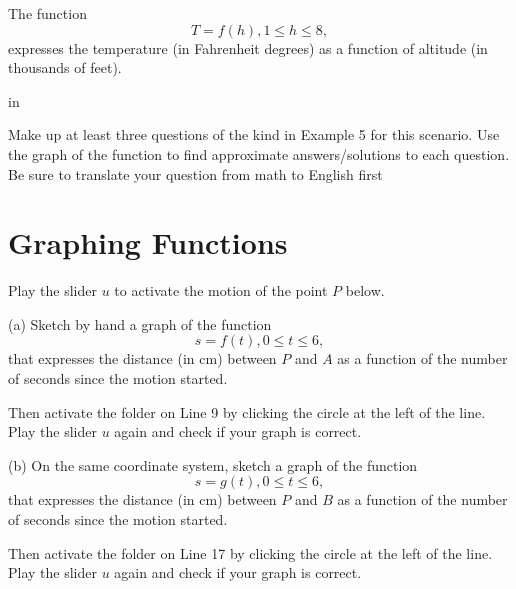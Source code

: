 \documentclass{ximera}
\newcommand{\pskip}{\vskip 0.1 in}
\begin{document}
\begin{example} \label{Ex:Fun65}
The function
\[
   T = f(h) , 1\leq h \leq 8,
\]
expresses the temperature (in Fahrenheit degrees) as a function of altitude (in thousands of feet). 

\pskip

Make up at least three questions of the kind in Example 5 for this scenario. Use the graph of the function to find approximate answers/solutions to each question. Be sure to translate your question from math to English first

\begin{exploration}\label{exp:Fun6}


 
\begin{onlineOnly}
    \begin{center}
\end{center}
\end{onlineOnly}
\end{exploration}

\end{example}





\section{Graphing Functions}

\begin{exploration}\label{exp:Bugs15}
Play the slider $u$ to activate the motion of the point $P$ below.

(a) Sketch by hand a graph of the function 
\[
   s=f(t), 0\leq t \leq 6 ,
\] 
that expresses the distance (in cm) between $P$ and $A$ as a function of the number of seconds since the motion started.

Then activate the folder on Line 9 by clicking the circle at the left of the line. Play the slider $u$ again and check if your graph is correct.

(b) On the same coordinate system, sketch a graph of the function 
\[
   s=g(t), 0\leq t \leq 6 ,
\] 
that expresses the distance (in cm) between $P$ and $B$ as a function of the number of seconds since the motion started.

Then activate the folder on Line 17 by clicking the circle at the left of the line. Play the slider $u$ again and check if your graph is correct.


 
\begin{onlineOnly}
    \begin{center}
\end{center}
\end{onlineOnly}
\end{exploration}
\end{document}
